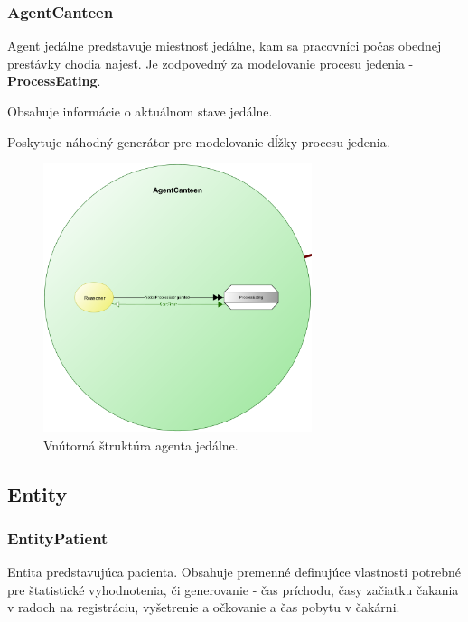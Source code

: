 \documentclass[letterpaper]{article}
\begin{document}
	\newpage
	
	\subsubsection{AgentCanteen}
	
	Agent jedálne predstavuje miestnosť jedálne, kam sa pracovníci počas obednej prestávky chodia najesť. Je zodpovedný za modelovanie procesu jedenia - \textbf{ProcessEating}.
	
	Obsahuje informácie o aktuálnom stave jedálne.
	
	Poskytuje náhodný generátor pre modelovanie dĺžky procesu jedenia.
	
	\vspace{0.8cm}
	
	\begin{figure}[hbt!]
		\centering
		\includegraphics[width=0.7\textwidth]{src/AgentCanteen}
		\caption{Vnútorná štruktúra agenta jedálne.}
	\end{figure}
	
	\newpage
	
	\subsection{Entity}
	
	\subsubsection{EntityPatient}
	
	Entita predstavujúca pacienta. Obsahuje premenné definujúce vlastnosti potrebné pre štatistické vyhodnotenia, či generovanie - čas príchodu, časy začiatku čakania v radoch na registráciu, vyšetrenie a očkovanie a čas pobytu v čakárni.
	
\end{document}
